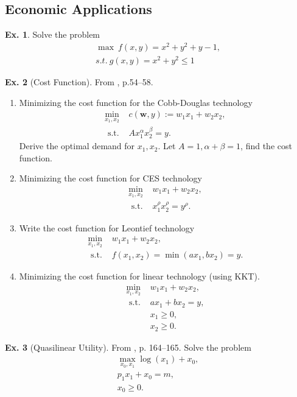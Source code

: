 \documentclass[11pt,a4paper]{book}
\theoremstyle{definition}\newtheorem{definition}{Definition}
\theoremstyle{definition}\newtheorem{fact}{Fact}
\theoremstyle{definition}\newtheorem{remark}{Remark}
\theoremstyle{definition}\newtheorem{ex}{Ex.}
\theoremstyle{definition}\newtheorem{project}{Project}
\theoremstyle{definition}\newtheorem{problem}{Problem}
\theoremstyle{definition}\newtheorem{example}{Example}
\numberwithin{theorem}{section}
\numberwithin{corollary}{chapter}
\numberwithin{assumption}{chapter}
\numberwithin{definition}{chapter}
\numberwithin{prop}{chapter}
\numberwithin{notation}{chapter}
\numberwithin{problem}{chapter}
\numberwithin{example}{chapter}
\numberwithin{fact}{chapter}
\numberwithin{ex}{chapter}
\def\w{\mathbf w}
\begin{document}
	\subsection{Economic Applications}
	\begin{ex}
		Solve the problem
		\begin{align*}
			&\max  \  f(x,y) = x^2 + y^2 + y - 1, \\
			&s.t. \ g(x,y) = x^2 + y^2 \leq 1 &                             
		\end{align*}
	\end{ex}
	
		\begin{ex}[Cost Function]
		From \citet{varian1992microeconomic}, p.54--58. 
		\begin{enumerate}
			\item Minimizing the cost function for the Cobb-Douglas technology
			\begin{align*}
				\min_{x_1, x_2} &c(\w, y):= w_1 x_1 + w_2 x_2, \\
				\text{ s.t. } &A x_1^\alpha x_2^\beta = y.
			\end{align*}
			Derive the optimal demand for $x_1, x_2$. Let $A=1, \alpha+\beta=1$, find the cost function.
			\item Minimizing the cost function for CES technology
			\begin{align*}
				\min_{x_1, x_2} & w_1 x_1 + w_2 x_2, \\
				\text{ s.t. } & x_1^\rho x_2^\rho = y^\rho.
			\end{align*}
			\item Write the cost function for Leontief technology
			\begin{align*}
				\min_{x_1, x_2} & w_1 x_1 + w_2 x_2, \\
				\text{ s.t. } & f(x_1,x_2) = \min (ax_1, bx_2) = y.
			\end{align*}
			\item Minimizing the cost function for linear technology (using KKT). 
			\begin{align*}
				\min_{x_1, x_2} & w_1 x_1 + w_2 x_2, \\
				\text{ s.t. } & a x_1 + b x_2 = y, \\
				& x_1 \geq 0, \\
				& x_2 \geq 0.
			\end{align*}
		\end{enumerate} 
	\end{ex}
	
	\begin{ex}[Quasilinear Utility]
		From \citet{varian1992microeconomic}, p. 164--165. Solve the problem
		\begin{align*}
			\max_{x_0, x_1} \log(x_1) + x_0, \\
			p_1 x_1 + x_0 = m, \\
			x_0 \geq 0.
		\end{align*}
	\end{ex}
	
\end{document}
